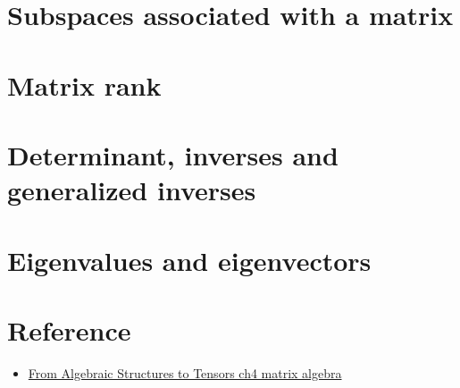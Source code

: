 \section{Subspaces associated with a matrix}

\section{Matrix rank}

\section{Determinant, inverses and generalized inverses}

\section{Eigenvalues and eigenvectors}


\section{Reference}
\begin{itemize}
    \item \href{}{From Algebraic Structures to Tensors ch4 matrix algebra}
\end{itemize}

